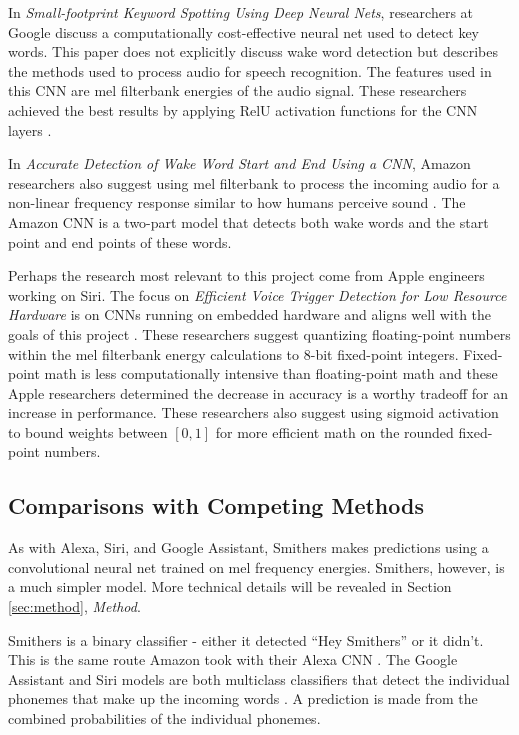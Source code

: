 \documentclass[conference]{IEEEtran}
\begin{document}
In \textit{Small-footprint Keyword Spotting Using Deep Neural Nets},
researchers at Google discuss a computationally cost-effective neural net used to detect key words.
This paper does not explicitly discuss wake word detection
but describes the methods used to process audio for speech recognition.
The features used in this CNN are mel filterbank energies of the audio signal.
These researchers achieved the best results
by applying RelU activation functions for the CNN layers \cite{smallfoot}.

In \textit{Accurate Detection of Wake Word Start and End Using a CNN}, 
Amazon researchers also suggest using mel filterbank to process the incoming audio
for a non-linear frequency response similar to how humans perceive sound \cite{wordstart}.
The Amazon CNN is a two-part model that detects both wake words
and the start point and end points of these words.

Perhaps the research most relevant to this project come from Apple engineers working on Siri.
The focus on \textit{Efficient Voice Trigger Detection for Low Resource Hardware}
is on CNNs running on embedded hardware and aligns well with the goals of this project \cite{Efficient}.
These researchers suggest quantizing floating-point numbers 
within the mel filterbank energy calculations to 8-bit fixed-point integers. 
Fixed-point math is less computationally intensive than floating-point math
and these Apple researchers determined the decrease in accuracy is a worthy tradeoff
for an increase in performance.
These researchers also suggest using sigmoid activation 
to bound weights between $[0,1]$ for more efficient math on the rounded fixed-point numbers.

\subsection{Comparisons with Competing Methods}

As with Alexa, Siri, and Google Assistant, Smithers makes predictions
using a convolutional neural net trained on mel frequency energies.
Smithers, however, is a much simpler model.
More technical details will be revealed in Section \ref{sec:method}, \textit{Method}.

Smithers is a binary classifier - either it detected ``Hey Smithers'' or it didn't.
This is the same route Amazon took with their Alexa CNN \cite{wordstart}.
The Google Assistant and Siri models are both multiclass classifiers that
detect the individual phonemes that make up the incoming words \cite{smallfoot}\cite{Efficient}.
A prediction is made from the combined probabilities of the individual phonemes.
\end{document}
